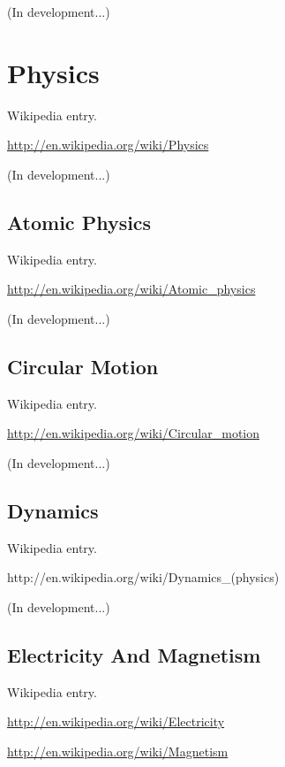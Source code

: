 \documentclass[12pt,twoside]{book}
\begin{document}
(In development...)

\section[Physics]{Physics}

Wikipedia entry.

\href{http://en.wikipedia.org/wiki/Physics}{http://en.wikipedia.org/wiki/Physics}

(In development...)

\subsection[Atomic Physics]{Atomic Physics}

Wikipedia entry.

\href{http://en.wikipedia.org/wiki/Atomic_physics}{http://en.wikipedia.org/wiki/Atomic\_physics}

(In development...)

\subsection[Circular Motion]{Circular Motion}

Wikipedia entry.

\href{http://en.wikipedia.org/wiki/Circular_motion}{http://en.wikipedia.org/wiki/Circular\_motion}

(In development...)

\subsection[Dynamics]{Dynamics}

Wikipedia entry.

http://en.wikipedia.org/wiki/Dynamics\_(physics)

(In development...)

\subsection[Electricity And Magnetism]{Electricity And Magnetism}

Wikipedia entry.

\href{http://en.wikipedia.org/wiki/Electricity}{http://en.wikipedia.org/wiki/Electricity}


\bigskip

\href{http://en.wikipedia.org/wiki/Magnetism}{http://en.wikipedia.org/wiki/Magnetism}
\end{document}
